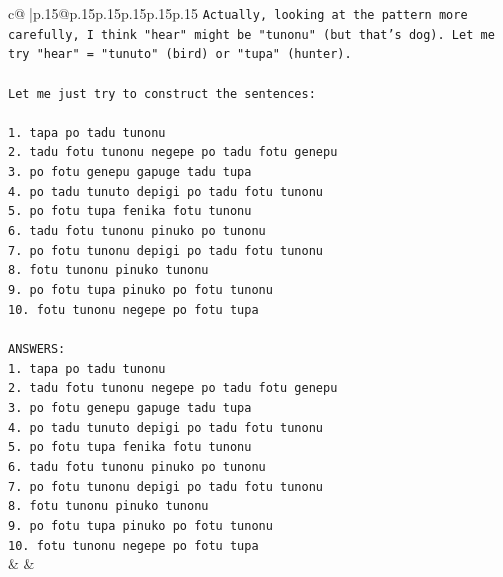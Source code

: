 \documentclass{article}
\begin{document}
{\begin{supertabular}{c@{$\;$}|p{.15\linewidth}@{}p{.15\linewidth}p{.15\linewidth}p{.15\linewidth}p{.15\linewidth}p{.15\linewidth}}
{{{\texttt{Actually, looking at the pattern more carefully, I think "hear" might be "tunonu" (but that's dog). Let me try "hear" = "tunuto" (bird) or "tupa" (hunter).} \\
\\ 
\texttt{Let me just try to construct the sentences:} \\
\\ 
\texttt{1. tapa po tadu tunonu} \\
\texttt{2. tadu fotu tunonu negepe po tadu fotu genepu} \\
\texttt{3. po fotu genepu gapuge tadu tupa} \\
\texttt{4. po tadu tunuto depigi po tadu fotu tunonu} \\
\texttt{5. po fotu tupa fenika fotu tunonu} \\
\texttt{6. tadu fotu tunonu pinuko po tunonu} \\
\texttt{7. po fotu tunonu depigi po tadu fotu tunonu} \\
\texttt{8. fotu tunonu pinuko tunonu} \\
\texttt{9. po fotu tupa pinuko po fotu tunonu} \\
\texttt{10. fotu tunonu negepe po fotu tupa} \\
\\ 
\texttt{ANSWERS:} \\
\texttt{1. tapa po tadu tunonu} \\
\texttt{2. tadu fotu tunonu negepe po tadu fotu genepu} \\
\texttt{3. po fotu genepu gapuge tadu tupa} \\
\texttt{4. po tadu tunuto depigi po tadu fotu tunonu} \\
\texttt{5. po fotu tupa fenika fotu tunonu} \\
\texttt{6. tadu fotu tunonu pinuko po tunonu} \\
\texttt{7. po fotu tunonu depigi po tadu fotu tunonu} \\
\texttt{8. fotu tunonu pinuko tunonu} \\
\texttt{9. po fotu tupa pinuko po fotu tunonu} \\
\texttt{10. fotu tunonu negepe po fotu tupa} \\
            }
        }
    }
    & & \\ \\


\end{supertabular}}
\end{document}
